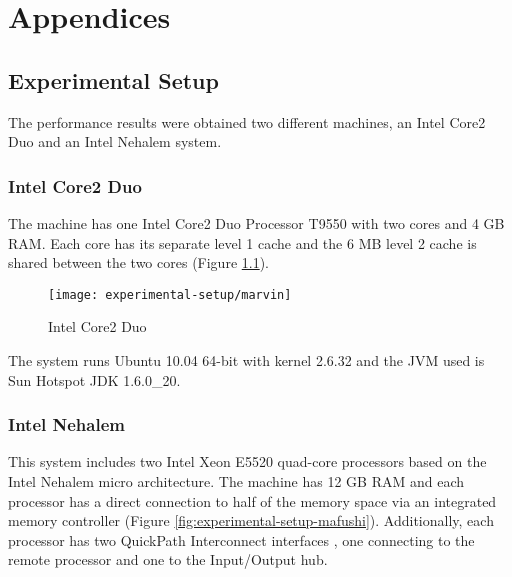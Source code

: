 
\part{Appendices}
\label{part:appendices}

\chapter{Experimental Setup}
\label{chap:experimental-setup}

The performance results were obtained two different machines, an Intel
Core2 Duo and an Intel Nehalem system.

\section{Intel Core2 Duo}
\label{sec:experimental-setup-marvin}

The machine has one Intel Core2 Duo Processor T9550 with two cores and
4 GB RAM. Each core has its separate level 1 cache and the 6 MB level
2 cache is shared between the two cores (Figure
\ref{fig:experimental-setup-marvin}).

\begin{figure}[htb]
  \centering
  \texttt{[image: experimental-setup/marvin]}
  \caption[Intel Core2 Duo]{Intel Core2 Duo}
  \label{fig:experimental-setup-marvin}
\end{figure}

The system runs Ubuntu 10.04 64-bit with kernel 2.6.32 and the JVM
used is Sun Hotspot JDK 1.6.0\_20.

\section{Intel Nehalem}
\label{sec:experimental-setup-mafushi}

This system includes two Intel Xeon E5520 quad-core processors based
on the Intel Nehalem micro architecture. The machine has 12 GB RAM and
each processor has a direct connection to half of the memory space via
an integrated memory controller (Figure
\ref{fig:experimental-setup-mafushi}). Additionally, each processor
has two QuickPath Interconnect interfaces \cite{Maddox2009}, one
connecting to the remote processor and one to the Input/Output hub.

